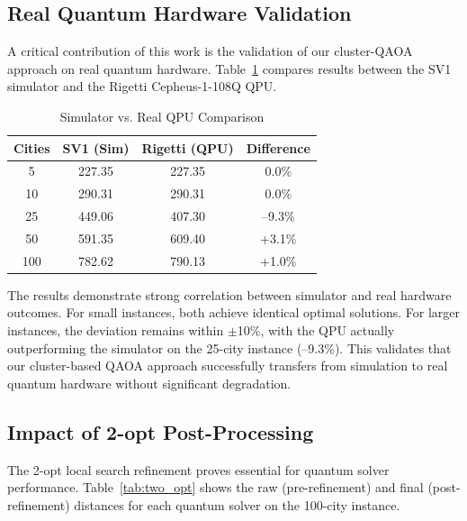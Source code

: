 \documentclass[conference]{IEEEtran}
\begin{document}
\subsection{Real Quantum Hardware Validation}

A critical contribution of this work is the validation of our cluster-QAOA approach on real quantum hardware. Table~\ref{tab:qpu_comparison} compares results between the SV1 simulator and the Rigetti Cepheus-1-108Q QPU.

\begin{table}[htbp]
\caption{Simulator vs. Real QPU Comparison}
\begin{center}
\begin{tabular}{|c|c|c|c|}
\hline
\textbf{Cities} & \textbf{SV1 (Sim)} & \textbf{Rigetti (QPU)} & \textbf{Difference} \\
\hline
5 & 227.35 & 227.35 & 0.0\% \\
\hline
10 & 290.31 & 290.31 & 0.0\% \\
\hline
25 & 449.06 & 407.30 & --9.3\% \\
\hline
50 & 591.35 & 609.40 & +3.1\% \\
\hline
100 & 782.62 & 790.13 & +1.0\% \\
\hline
\end{tabular}
\label{tab:qpu_comparison}
\end{center}
\end{table}

The results demonstrate strong correlation between simulator and real hardware outcomes. For small instances, both achieve identical optimal solutions. For larger instances, the deviation remains within $\pm$10\%, with the QPU actually outperforming the simulator on the 25-city instance (--9.3\%). This validates that our cluster-based QAOA approach successfully transfers from simulation to real quantum hardware without significant degradation.

\subsection{Impact of 2-opt Post-Processing}

The 2-opt local search refinement proves essential for quantum solver performance. Table~\ref{tab:two_opt} shows the raw (pre-refinement) and final (post-refinement) distances for each quantum solver on the 100-city instance.
\end{document}
